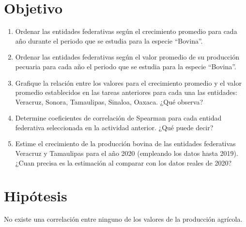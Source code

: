 \documentclass{article}
\begin{document}
\newpage

\section*{\Huge Objetivo}
\vspace{1 cm}
\begin{enumerate}
    \item Ordenar las entidades federativas según el crecimiento promedio para cada año durante el periodo que se estudia para la especie “Bovina”.
    \item Ordenar las entidades federativas según el valor promedio de su producción pecuaria para cada año el periodo que se estudia para la especie “Bovina”.
    \item Grafique la relación entre los valores para el crecimiento promedio y el valor promedio establecidos en las tareas anteriores para cada una las entidades: Veracruz, Sonora, Tamaulipas, Sinaloa, Oaxaca. ¿Qué observa?
    \item Determine coeficientes de correlación de Spearman para cada entidad federativa seleccionada en la actividad anterior. ¿Qué puede decir?
    \item Estime el crecimiento de la producción bovina de las entidades federativas Veracruz y Tamaulipas para el año 2020 (empleando los datos hasta 2019). ¿Cuan precisa es la estimación al comparar con los datos reales de 2020?
\end{enumerate}
\newpage

\section*{\Huge Hipótesis}
No existe una correlación entre ninguno de los valores de la producción agrícola.

\newpage
\end{document}
